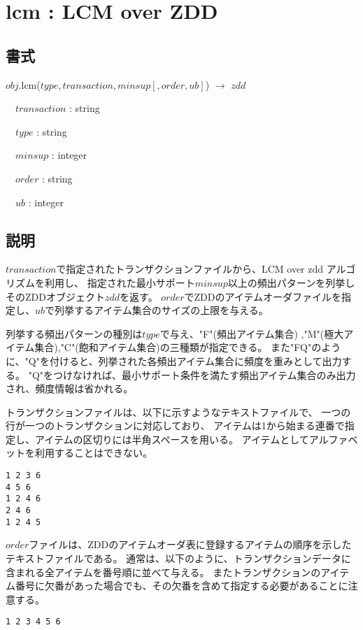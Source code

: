 
\section{lcm : LCM over ZDD\label{sect:lcm}}
\subsection*{書式}

$obj$.lcm($type,transaction,minsup[,order,ub]$) $\rightarrow$ $zdd$

~~$transaction$ : string

~~$type$ : string

~~$minsup$ : integer

~~$order$ : string

~~$ub$ : integer

\subsection*{説明}
$transaction$で指定されたトランザクションファイルから、LCM over zdd アルゴリズムを利用し、
指定された最小サポート$minsup$以上の頻出パターンを列挙しそのZDDオブジェクト$zdd$を返す。
$order$でZDDのアイテムオーダファイルを指定し、$ub$で列挙するアイテム集合のサイズの上限を与える。

列挙する頻出パターンの種別は$type$で与え、"F"(頻出アイテム集合)
,"M"(極大アイテム集合),"C"(飽和アイテム集合)の三種類が指定できる。
また"FQ"のように、"Q"を付けると、列挙された各頻出アイテム集合に頻度を重みとして出力する。
"Q"をつけなければ、最小サポート条件を満たす頻出アイテム集合のみ出力され、頻度情報は省かれる。

トランザクションファイルは、以下に示すようなテキストファイルで、
一つの行が一つのトランザクションに対応しており、
アイテムは1から始まる連番で指定し、アイテムの区切りには半角スペースを用いる。
アイテムとしてアルファベットを利用することはできない。

\begin{Verbatim}[baselinestretch=0.7,frame=single]
1 2 3 6
4 5 6
1 2 4 6
2 4 6
1 2 4 5
\end{Verbatim}

$order$ファイルは、ZDDのアイテムオーダ表に登録するアイテムの順序を示したテキストファイルである。
通常は、以下のように、トランザクションデータに含まれる全アイテムを番号順に並べて与える。
またトランザクションのアイテム番号に欠番があった場合でも、その欠番を含めて指定する必要があることに注意する。
\begin{Verbatim}[baselinestretch=0.7,frame=single]
1 2 3 4 5 6
\end{Verbatim}

